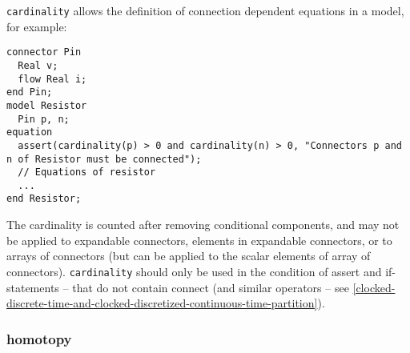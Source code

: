 \begin{nonnormative}
\lstinline!cardinality! allows the definition of connection dependent equations in a model, for example:
\begin{lstlisting}[language=modelica]
connector Pin
  Real v;
  flow Real i;
end Pin;
model Resistor
  Pin p, n;
equation
  assert(cardinality(p) > 0 and cardinality(n) > 0, "Connectors p and n of Resistor must be connected");
  // Equations of resistor
  ...
end Resistor;
\end{lstlisting}
\end{nonnormative}

The cardinality is counted after removing conditional components, and
may not be applied to expandable connectors, elements in expandable
connectors, or to arrays of connectors (but can be applied to the scalar
elements of array of connectors). \lstinline!cardinality! should only
be used in the condition of assert and if-statements -- that do not
contain connect (and similar operators -- see \cref{clocked-discrete-time-and-clocked-discretized-continuous-time-partition}).

\subsubsection{homotopy}\label{homotopy}


